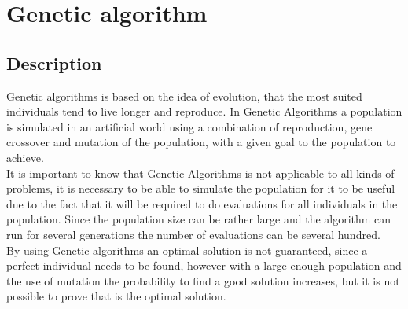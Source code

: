 \section{Genetic algorithm}
\subsection{Description}
Genetic algorithms is based on the idea of evolution, that the most suited individuals tend to live longer and reproduce. In Genetic Algorithms a population is simulated in an artificial world using a combination of reproduction, gene crossover and mutation of the population, with a given goal to the population to achieve.\cite{GAHandbook1}\\
It is important to know that Genetic Algorithms is not applicable to all kinds of problems, it is necessary to be able to simulate the population for it to be useful due to the fact that it will be required to do evaluations for all individuals in the population. Since the population size can be rather large and the algorithm can run for several generations the number of evaluations can be several hundred.\\
By using Genetic algorithms an optimal solution is not guaranteed, since a perfect individual needs to be found, however with a large enough population and the use of mutation the probability to find a good solution increases, but it is not possible to prove that is the optimal solution.

